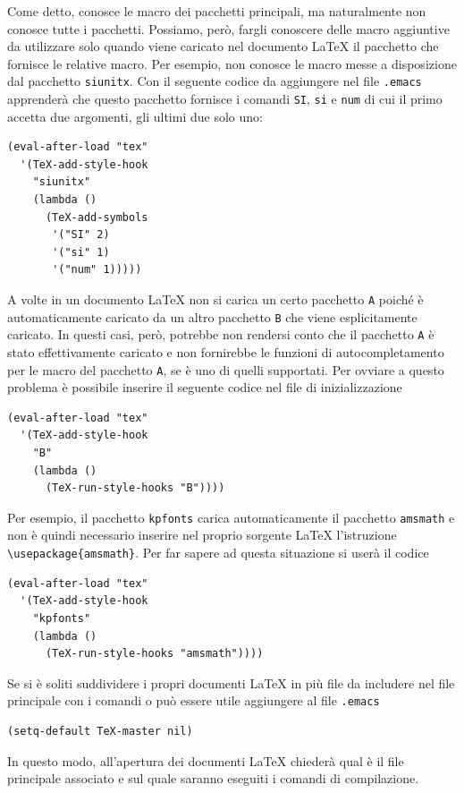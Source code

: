 \documentclass[11pt,a4paper]{article}
\begin{document}
Come detto, \auctex{} conosce le macro dei pacchetti principali, ma naturalmente
non conosce tutte i pacchetti.  Possiamo, però, fargli conoscere delle macro
aggiuntive da utilizzare solo quando viene caricato nel documento \LaTeX{} il
pacchetto che fornisce le relative macro.  Per esempio, \auctex{} non conosce le
macro messe a disposizione dal pacchetto \verb!siunitx!.  Con il seguente codice
da aggiungere nel file \verb!.emacs! apprenderà che questo pacchetto fornisce i
comandi \verb!SI!, \verb!si! e \verb!num! di cui il primo accetta due argomenti,
gli ultimi due solo uno:
\begin{Verbatim}
(eval-after-load "tex"
  '(TeX-add-style-hook
    "siunitx"
    (lambda ()
      (TeX-add-symbols
       '("SI" 2)
       '("si" 1)
       '("num" 1)))))
\end{Verbatim}
A volte in un documento \LaTeX{} non si carica un certo pacchetto \verb!A!
poiché è automaticamente caricato da un altro pacchetto \verb!B! che viene
esplicitamente caricato.  In questi casi, però, \auctex{} potrebbe non rendersi
conto che il pacchetto \verb!A! è stato effettivamente caricato e non fornirebbe
le funzioni di autocompletamento per le macro del pacchetto \verb!A!, se è uno
di quelli supportati.  Per ovviare a questo problema è possibile inserire il
seguente codice nel file di inizializzazione
\begin{Verbatim}
(eval-after-load "tex"
  '(TeX-add-style-hook
    "B"
    (lambda ()
      (TeX-run-style-hooks "B"))))
\end{Verbatim}
Per esempio, il pacchetto \verb!kpfonts! carica automaticamente il pacchetto
\verb!amsmath! e non è quindi necessario inserire nel proprio sorgente \LaTeX{}
l'istruzione \verb!\usepackage{amsmath}!.  Per far sapere ad \auctex{} questa
situazione si userà il codice
\begin{Verbatim}
(eval-after-load "tex"
  '(TeX-add-style-hook
    "kpfonts"
    (lambda ()
      (TeX-run-style-hooks "amsmath"))))
\end{Verbatim}

Se si è soliti suddividere i propri documenti \LaTeX{} in più file da includere
nel file principale con i comandi \verb!! o \verb!! può essere
utile aggiungere al file \verb!.emacs!
\begin{Verbatim}
(setq-default TeX-master nil)
\end{Verbatim}
In questo modo, all'apertura dei documenti \LaTeX{} \emacs{} chiederà qual è il
file principale associato e sul quale saranno eseguiti i comandi di
compilazione.
\end{document}
